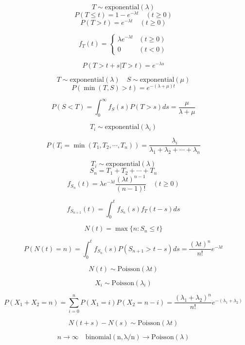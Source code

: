 \documentclass[12pt,a4paper]{article}
\author{Jiejia Xu}
\begin{document}
\[
T \sim \mathrm{exponential}(\lambda)
\]
\[
P(T \leq t) = 1- e^{-\lambda t} \quad (t\geq 0)
\]
\[
P(T > t) = e^{-\lambda t} \quad (t\geq 0)
\]

\[
f_T(t) = \begin{cases}
\lambda e^{-\lambda t} & (t \geq 0) \\
0 & (t < 0)
\end{cases}
\]

\[
P(T > t + s |T > t) = e^{-\lambda s}
\]

\[
T \sim \mathrm{exponential}(\lambda) \quad S \sim \mathrm{exponential}(\mu)
\]
\[
P(\min(T,S) > t) = e^{-(\lambda + \mu)t}
\]

\[
P(S<T) = \int_0^{\infty} f_S(s)P(T>s)ds = \frac{\mu}{\lambda+\mu}
\]

\[
T_i \sim \mathrm{exponential}(\lambda_i)
\]

\[
P(T_i = \min(T_1,T_2, \cdots, T_n)) = \frac{\lambda_i}{\lambda_1+\lambda_2 + \cdots + \lambda_n}
\]

\[
T_i \sim \mathrm{exponential}(\lambda)
\]
\[
S_n = T_1 + T_2 + \cdots + T_n
\]
\[
f_{S_n}(t) = \lambda e^{-\lambda t} \frac{(\lambda t)^{n-1}}{(n-1)!} \quad (t \geq 0)
\]

\[
f_{S_{n+1}}(t) = \int_0^t f_{S_n}(s)f_{T}(t-s)ds
\]

\[
N(t) = \max\{n: S_n \leq t\}
\]

\[
P(N(t) = n) = \int_0^t f_{S_n}(s)P(S_{n+1} > t-s)ds=  \frac{(\lambda t)^n}{n!}e^{-\lambda t}
\]

\[
N(t) \sim \mathrm{Poisson}(\lambda t)
\]

\[
X_i \sim \mathrm{Poisson}(\lambda_i)
\]

\[
P(X_1+X_2 = n) = \sum_{i = 0}^n P(X_1 = i)P(X_2 = n-i) = \frac{(\lambda_1+\lambda_2)^n}{n!}e^{-(\lambda_1+\lambda_2)}
\]

\[
N(t+s) - N(s) \sim \mathrm{Poisson}(\lambda t)
\]

\[
n \rightarrow \infty \quad \mathrm{binomial(n,\lambda/n)} \rightarrow \mathrm{Poisson}(\lambda) 
\]
\end{document}
